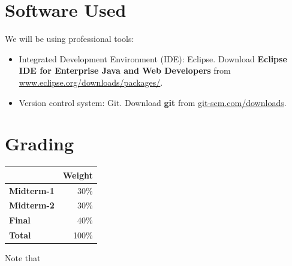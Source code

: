 


\section{Software Used}
We will be using professional tools:
\begin{itemize}
	
	\item 
	Integrated Development Environment (IDE): Eclipse. 
	Download \textbf{Eclipse IDE for Enterprise Java and Web Developers} from 
	\href{https://www.eclipse.org/downloads/packages/} 
		{www.eclipse.org/downloads/packages/}.
	
	\item 
	Version control system: Git. 
	Download \textbf{git} from 
	\href{https://git-scm.com/downloads}
		{git-scm.com/downloads}.

\end{itemize}




\section{Grading}






\begin{center}
  \begin{tabular}{|l |r |}
    \hline
              &\textbf{Weight}\\
    \hline
    \textbf{Midterm-1}		&30\%  \\
    \textbf{Midterm-2}		&30\%  \\
    \textbf{Final}			&40\%  \\
    \hline
    \textbf{Total}			& 100\% \\
    \hline
  \end{tabular}
\end{center}


Note that 

